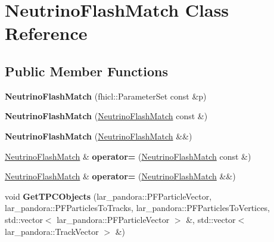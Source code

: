 \hypertarget{classNeutrinoFlashMatch}{\section{\-Neutrino\-Flash\-Match \-Class \-Reference}
\label{classNeutrinoFlashMatch}
}
\subsection*{\-Public \-Member \-Functions}
\begin{DoxyCompactItemize}
\item 
\hypertarget{classNeutrinoFlashMatch_a2c3aa4e9461e3f31e9d198ba5d481cd6}{{\bfseries \-Neutrino\-Flash\-Match} (fhicl\-::\-Parameter\-Set const \&p)}\label{classNeutrinoFlashMatch_a2c3aa4e9461e3f31e9d198ba5d481cd6}

\item 
\hypertarget{classNeutrinoFlashMatch_a274b502322eee527a58f418f2ef45b56}{{\bfseries \-Neutrino\-Flash\-Match} (\hyperlink{classNeutrinoFlashMatch}{\-Neutrino\-Flash\-Match} const \&)}\label{classNeutrinoFlashMatch_a274b502322eee527a58f418f2ef45b56}

\item 
\hypertarget{classNeutrinoFlashMatch_a5191a4fe7a1cbb25346eb6bba9edd144}{{\bfseries \-Neutrino\-Flash\-Match} (\hyperlink{classNeutrinoFlashMatch}{\-Neutrino\-Flash\-Match} \&\&)}\label{classNeutrinoFlashMatch_a5191a4fe7a1cbb25346eb6bba9edd144}

\item 
\hypertarget{classNeutrinoFlashMatch_a86dab2fde3a8b37a5ec89e4dc1850a2e}{\hyperlink{classNeutrinoFlashMatch}{\-Neutrino\-Flash\-Match} \& {\bfseries operator=} (\hyperlink{classNeutrinoFlashMatch}{\-Neutrino\-Flash\-Match} const \&)}\label{classNeutrinoFlashMatch_a86dab2fde3a8b37a5ec89e4dc1850a2e}

\item 
\hypertarget{classNeutrinoFlashMatch_ab9c0c085e8f31926395d06088c02fafe}{\hyperlink{classNeutrinoFlashMatch}{\-Neutrino\-Flash\-Match} \& {\bfseries operator=} (\hyperlink{classNeutrinoFlashMatch}{\-Neutrino\-Flash\-Match} \&\&)}\label{classNeutrinoFlashMatch_ab9c0c085e8f31926395d06088c02fafe}

\item 
\hypertarget{classNeutrinoFlashMatch_a5e24507dbf84fd2e60abee5c317d5c7b}{void {\bfseries \-Get\-T\-P\-C\-Objects} (lar\-\_\-pandora\-::\-P\-F\-Particle\-Vector, lar\-\_\-pandora\-::\-P\-F\-Particles\-To\-Tracks, lar\-\_\-pandora\-::\-P\-F\-Particles\-To\-Vertices, std\-::vector$<$ lar\-\_\-pandora\-::\-P\-F\-Particle\-Vector $>$ \&, std\-::vector$<$ lar\-\_\-pandora\-::\-Track\-Vector $>$ \&)}\label{classNeutrinoFlashMatch_a5e24507dbf84fd2e60abee5c317d5c7b}


\end{DoxyCompactItemize}
